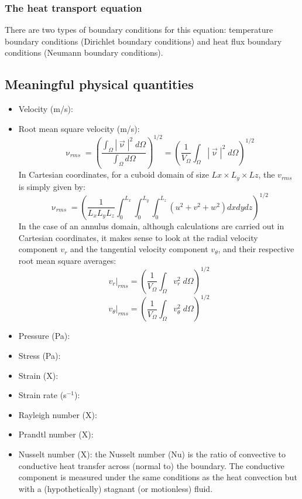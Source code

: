 \subsubsection{The heat transport equation}

There are two types of boundary conditions for this equation: temperature boundary conditions (Dirichlet boundary conditions) and heat flux boundary conditions (Neumann boundary conditions). 

\newpage
\subsection{Meaningful physical quantities}

\begin{itemize}
\item Velocity (m/s):
\item Root mean square velocity (m/s): 
\begin{equation}
\upnu_{rms} = \left ( \frac{\int_\Omega |{\vec \upnu}|^2 \;  d \Omega}{\int_\Omega d\Omega }  \right )^{1/2}
=\left ( \frac{1}{V_\Omega} \int_\Omega |{\vec \upnu}|^2 \;  d \Omega \right )^{1/2} \label{eqVrms}
\end{equation}
In Cartesian coordinates, for a cuboid domain of size $Lx\times L_y \times Lz$, the $v_{rms}$ is simply given by:
\begin{equation}
\upnu_{rms}  = \left ( \frac{1}{L_xL_yL_z} \int_0^{L_x}\int_0^{L_y}\int_0^{L_z} (u^2 + v^2 + w^2) dxdydz  \right )^{1/2}
\end{equation}
In the case of an annulus domain, although calculations are carried out in Cartesian coordinates, it makes sense
to look at the radial velocity component $v_r$ and the tangential velocity component $v_\theta$, and their respective
root mean square averages:
\begin{equation}
v_r|_{rms}  =\left ( \frac{1}{V_\Omega} \int_\Omega v_r^2 \;  d \Omega \right )^{1/2} \label{eqVrVrms}
\end{equation}
\begin{equation}
v_\theta|_{rms}  = \left ( \frac{1}{V_\Omega} \int_\Omega v_\theta^2 \;  d \Omega \right )^{1/2} \label{eqThetaVrms}
\end{equation}


\item Pressure (Pa):
\item Stress (Pa):
\item Strain (X):
\item Strain rate (s$^{-1}$):
\item Rayleigh number (X):
\item Prandtl number (X):
\item Nusselt number (X):  the Nusselt number (Nu) is the ratio of convective to conductive heat transfer across (normal to) the boundary. The conductive component is measured under the same conditions as the heat convection but with a (hypothetically) stagnant (or motionless) fluid.


\end{itemize}
